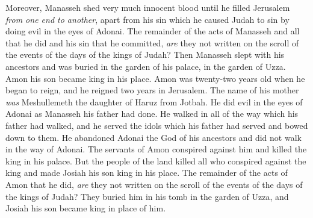 \begin{biblechapter}
\verse Moreover, Manasseh shed very much innocent blood until he filled Jerusalem \textit{from one end to another}, apart from his sin which he caused Judah to sin by doing evil in the eyes of Adonai.
\verse The remainder of the acts of Manasseh and all that he did and his sin that he committed, \textit{are} they not written on the scroll of the events of the days of the kings of Judah?
\verse Then Manasseh slept with his ancestors and was buried in the garden of his palace, in the garden of Uzza. Amon his son became king in his place.
 Amon was twenty-two years old when he began to reign, and he reigned two years in Jerusalem. The name of his mother \textit{was} Meshullemeth the daughter of Haruz from Jotbah.
\verse He did evil in the eyes of Adonai as Manasseh his father had done.
\verse He walked in all of the way which his father had walked, and he served the idols which his father had served and bowed down to them.
\verse He abandoned Adonai the God of his ancestors and did not walk in the way of Adonai.
\verse The servants of Amon conspired against him and killed the king in his palace.
\verse But the people of the land killed all who conspired against the king and made Josiah his son king in his place.
\verse The remainder of the acts of Amon that he did, \textit{are} they not written on the scroll of the events of the days of the kings of Judah?
\verse They buried him in his tomb in the garden of Uzza, and Josiah his son became king in place of him.
\end{biblechapter}

